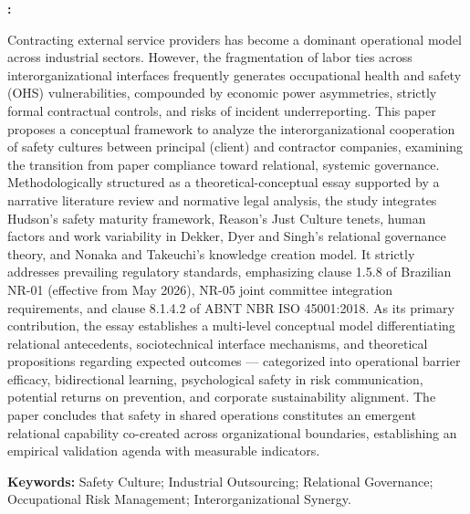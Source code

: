 \documentclass[12pt,a4paper]{article}
\renewenvironment{abstract}{%
  \small\begin{list}{}{%
    \setlength{\leftmargin}{0cm}%
    \setlength{\rightmargin}{0cm}%
  }%
  \item\relax\textbf{\abstractname:}\space
}{\end{list}}
\begin{document}
\vspace{0.3cm}

\begin{abstract}
\fontsize{10}{12}\selectfont\singlespacing\justifying
Contracting external service providers has become a dominant operational model across industrial sectors. However, the fragmentation of labor ties across interorganizational interfaces frequently generates occupational health and safety (OHS) vulnerabilities, compounded by economic power asymmetries, strictly formal contractual controls, and risks of incident underreporting. This paper proposes a conceptual framework to analyze the interorganizational cooperation of safety cultures between principal (client) and contractor companies, examining the transition from paper compliance toward relational, systemic governance. Methodologically structured as a theoretical-conceptual essay supported by a narrative literature review and normative legal analysis, the study integrates Hudson’s safety maturity framework, Reason’s Just Culture tenets, human factors and work variability in Dekker, Dyer and Singh’s relational governance theory, and Nonaka and Takeuchi’s knowledge creation model. It strictly addresses prevailing regulatory standards, emphasizing clause 1.5.8 of Brazilian NR-01 (effective from May 2026), NR-05 joint committee integration requirements, and clause 8.1.4.2 of ABNT NBR ISO 45001:2018. As its primary contribution, the essay establishes a multi-level conceptual model differentiating relational antecedents, sociotechnical interface mechanisms, and theoretical propositions regarding expected outcomes — categorized into operational barrier efficacy, bidirectional learning, psychological safety in risk communication, potential returns on prevention, and corporate sustainability alignment. The paper concludes that safety in shared operations constitutes an emergent relational capability co-created across organizational boundaries, establishing an empirical validation agenda with measurable indicators.
\end{abstract}

\noindent\fontsize{10}{12}\selectfont\textbf{Keywords:} Safety Culture; Industrial Outsourcing; Relational Governance; Occupational Risk Management; Interorganizational Synergy.

\vspace{0.3cm}
\end{document}
